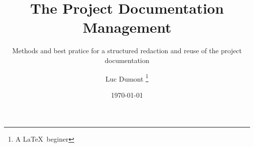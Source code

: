 \documentclass[
	fontsize=10pt, %
	twoside=false, %
	numbers=noenddot, %
]{kaobook}
\begin{document}
\title[The Project Documentation Management]{The Project Documentation Management}
\subtitle{Methods and best pratice for a structured redaction and reuse of the project documentation}
\author[Luc Dumont]{Luc Dumont \thanks{A \LaTeX\ beginer}}
\date{\today}
\publishers{Naept Editions}
\frontmatter %


\mainmatter %

% 
% 
% 
% 
% 
% 

% 
% 
% 
% 
% 
% 
% 
% 


\backmatter %
\end{document}
